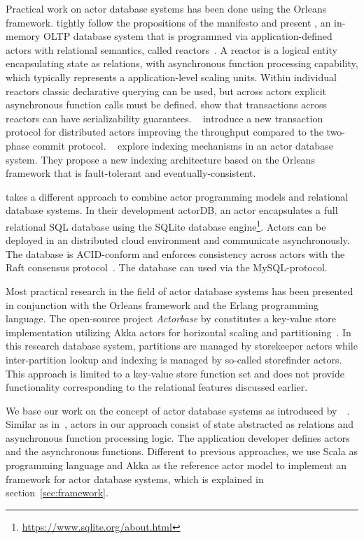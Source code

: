   Practical work on actor database systems has been done using the Orleans framework.
  \citeauthor{Shah:reactdb} tightly follow the propositions of the manifesto and present \reactdb{},
  an in-memory OLTP database system that is programmed via application-defined actors with relational semantics, called reactors~\cite{Shah:reactdb}.
  A reactor is a logical entity encapsulating state as relations, with
  asynchronous function processing capability, which typically represents a application-level scaling units.
  Within individual reactors classic declarative querying can be used, but across actors explicit asynchronous function calls must be defined.
  \citeauthor{Shah:reactdb} show that transactions across reactors can have serializability guarantees.
  \citeauthor{Eldeeb:transactions}~\cite{Eldeeb:transactions} introduce a new transaction protocol for distributed actors improving the throughput compared to the two-phase commit protocol.
  \citeauthor{Bernstein:indexing}~\cite{Bernstein:indexing} explore indexing mechanisms in an actor database system.
  They propose a new indexing architecture based on the Orleans framework that is fault-tolerant and eventually-consistent.

  \citeauthor{biokoda:actordb} takes a different approach to combine actor programming models and relational database systems.
  In their development actorDB, an actor encapsulates a full relational SQL database using the SQLite database engine\footnote{\url{https://www.sqlite.org/about.html}}.
  Actors can be deployed in an distributed cloud environment and communicate asynchronously.
  The database is ACID-conform and enforces consistency across actors with the Raft consensus protocol~\cite{raft}.
  The database can used via the MySQL-protocol.

  Most practical research in the field of actor database systems has been presented in conjunction with the Orleans framework and the Erlang programming language.
  The open-source project \textit{Actorbase} by \citeauthor{actorbase} constitutes a key-value store implementation utilizing Akka actors for horizontal scaling and partitioning~\cite{actorbase}.
  In this research database system, partitions are managed by storekeeper actors while inter-partition lookup and indexing is managed by so-called storefinder actors.
  This approach is limited to a key-value store function set and does not provide functionality corresponding to the relational features discussed earlier.
  
  We base our work on the concept of actor database systems as introduced by~\citeauthor{manifesto}~\cite{manifesto}.
  Similar as in~\cite{Shah:reactdb}, actors in our approach consist of state abstracted as relations and asynchronous function processing logic.
  The application developer defines actors and the asynchronous functions.
  Different to previous approaches, we use Scala as programming language and Akka as the reference actor model to implement an framework for actor database systems, which is explained in section~\ref{sec:framework}.
